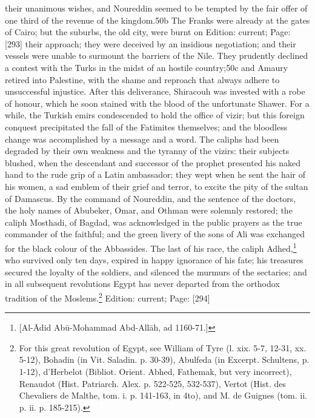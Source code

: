 their unanimous wishes, and Noureddin seemed to be tempted by the fair offer of one third of the revenue of the kingdom.50b The Franks were already at the gates of Cairo; but the suburbs, the old city, were burnt on Edition: current; Page: [293] their approach; they were deceived by an insidious negotiation; and their vessels were unable to surmount the barriers of the Nile. They prudently declined a contest with the Turks in the midst of an hostile country;50c and Amaury retired into Palestine, with the shame and reproach that always adhere to unsuccessful injustice. After this deliverance, Shiracouh was invested with a robe of honour, which he soon stained with the blood of the unfortunate Shawer. For a while, the Turkish emirs condescended to hold the office of vizir; but this foreign conquest precipitated the fall of the Fatimites themselves; and the bloodless change was accomplished by a message and a word. The caliphs had been degraded by their own weakness and the tyranny of the vizirs: their subjects blushed, when the descendant and successor of the prophet presented his naked hand to the rude grip of a Latin ambassador; they wept when he sent the hair of his women, a sad emblem of their grief and terror, to excite the pity of the sultan of Damascus. By the command of Noureddin, and the sentence of the doctors, the holy names of Abubeker, Omar, and Othman were solemnly restored; the caliph Mosthadi, of Bagdad, was acknowledged in the public prayers as the true commander of the faithful; and the green livery of the sons of Ali was exchanged for the black colour of the Abbassides. The last of his race, the caliph Adhed,\footnote{[Al-Ādid Abū-Mohammad Abd-Allāh, ad 1160-71.]} who survived only ten days, expired in happy ignorance of his fate; his treasures secured the loyalty of the soldiers, and silenced the murmurs of the sectaries; and in all subsequent revolutions Egypt has never departed from the orthodox tradition of the Moslems.\footnote{For this great revolution of Egypt, see William of Tyre (l. xix. 5-7, 12-31, xx. 5-12), Bohadin (in Vit. Saladin. p. 30-39), Abulfeda (in Excerpt. Schultens, p. 1-12), d\texthebrew{}’Herbelot (Bibliot. Orient. Abhed, Fathemak, but very incorrect), Renaudot (Hist. Patriarch. Alex. p. 522-525, 532-537), Vertot (Hist. des Chevaliers de Malthe, tom. i. p. 141-163, in 4to), and M. de Guignes (tom. ii. p. ii. p. 185-215).}
Edition: current; Page: [294]

